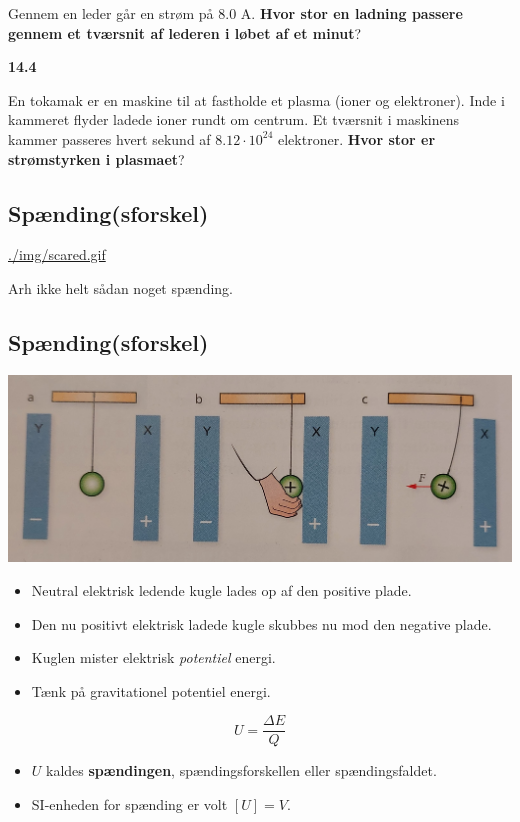 \documentclass[11pt]{article}
\begin{document}
Gennem en leder går en strøm på 8.0 A. \textbf{Hvor stor en ladning passere gennem et tværsnit af lederen i løbet af et minut}?


\textbf{14.4}

En tokamak er en maskine til at fastholde et plasma (ioner og elektroner). Inde i kammeret flyder ladede ioner rundt om centrum. Et tværsnit i maskinens kammer passeres hvert sekund af \(8.12 \cdot 10^{24}\) elektroner. \textbf{Hvor stor er strømstyrken i plasmaet}?

\subsection*{Spænding(sforskel)}
\label{sec:org88a259e}

\url{./img/scared.gif}

Arh ikke helt sådan noget spænding.

\subsection*{Spænding(sforskel)}
\label{sec:org080f1fc}
\begin{center}
\includegraphics[width=.9\linewidth]{./img/spaendingsforskel.jpg}
\end{center}
\begin{itemize}
\item Neutral elektrisk ledende kugle lades op af den positive plade.
\item Den nu positivt elektrisk ladede kugle skubbes nu mod den negative plade.
\item Kuglen mister elektrisk \emph{potentiel} energi.
\item Tænk på gravitationel potentiel energi.
\end{itemize}
$$\boxed{U = \frac{\Delta E}{Q}}$$
\begin{itemize}
\item \(U\) kaldes \textbf{spændingen}, spændingsforskellen eller spændingsfaldet.
\item SI-enheden for spænding er volt \(\left[ U \right] = V\).
\end{itemize}
\end{document}
